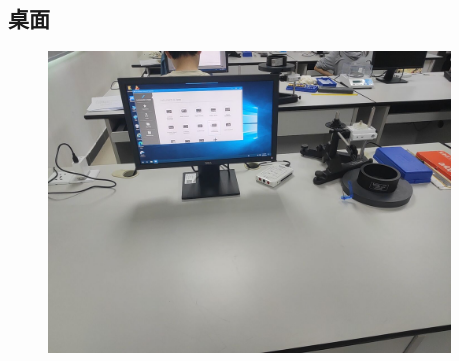 \documentclass[dvipsnames, svgnames,a4paper,11pt]{article}
\begin{document}
\subsection*{桌面}
\begin{figure}[!h]
	\includegraphics[width=0.95\textwidth]{实验6桌面.jpg}
\end{figure}
\end{document}
